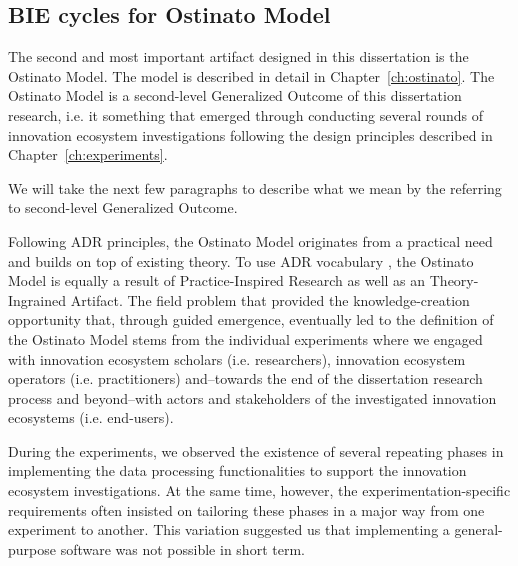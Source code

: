 \subsection{BIE cycles for Ostinato Model}

The second and most important artifact designed in this dissertation is the Ostinato Model. The model is described in detail in Chapter~\ref{ch:ostinato}. The Ostinato Model is a second-level Generalized Outcome \citep[cf.][]{Sein2011ActionResearch} of this dissertation research, i.e. it something that emerged through conducting several rounds of innovation ecosystem investigations following the design principles described in Chapter~\ref{ch:experiments}.

We will take the next few paragraphs to describe what we mean by the referring to second-level Generalized Outcome.

Following ADR principles, the Ostinato Model originates from a practical need and builds on top of existing theory. To use ADR vocabulary \citep{Sein2011ActionResearch}, the Ostinato Model is equally a result of Practice-Inspired Research as well as an Theory-Ingrained Artifact. The field problem that provided the knowledge-creation opportunity that, through guided emergence, eventually led to the definition of the Ostinato Model stems from the individual experiments where we engaged with innovation ecosystem scholars (i.e. researchers), innovation ecosystem operators (i.e. practitioners) and--towards the end  of the dissertation research process and beyond--with actors and stakeholders of the investigated innovation ecosystems (i.e. end-users).

During the experiments, we observed the existence of several repeating phases in implementing the data processing functionalities to support the innovation ecosystem investigations. At the same time, however, the experimentation-specific requirements often insisted on tailoring these phases in a major way from one experiment to another. This variation suggested us that implementing a general-purpose software was not possible in short term.

